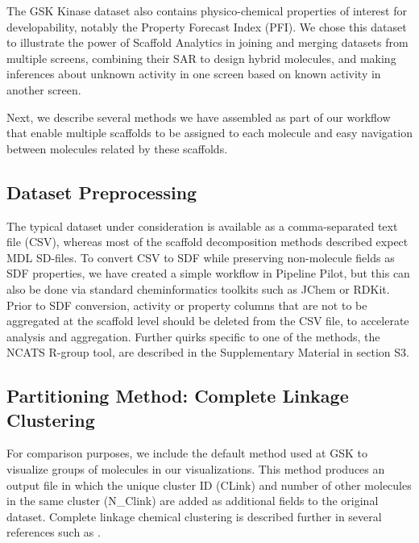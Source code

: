 \documentclass[journal=jacsat,biochem,manuscript=article]{achemso}
\newcommand*\tref[1]{Table~\ref{table:#1}}
\begin{document}
The GSK Kinase dataset also contains physico-chemical properties of interest for
developability, notably the Property Forecast Index (PFI\cite{Young2011}). 
We chose this dataset to illustrate the power of Scaffold Analytics in joining
and merging datasets from multiple screens, combining their SAR to
design hybrid molecules, and making inferences about unknown activity
in one screen based on known activity in another screen.


Next, we describe several methods we have assembled as part of our
workflow that enable multiple scaffolds to be assigned to each
molecule and easy navigation between molecules related by these
scaffolds.


\subsection{Dataset Preprocessing}
\label{sec:prepro}
The typical dataset under consideration is available as a
comma-separated text file (CSV), whereas most of the scaffold
decomposition methods described expect MDL SD-files. To convert CSV to
SDF while preserving non-molecule fields as SDF properties, we have
created a simple workflow in Pipeline Pilot\cite{PPilot}, but this can also be done
via standard cheminformatics toolkits such as JChem\cite{JChem} or RDKit\cite{RDKit}. Prior to
SDF conversion, activity or property columns that are not to be
aggregated at the scaffold level should be deleted from the CSV file,
to accelerate analysis and aggregation.  Further quirks specific to one of the methods, the NCATS R-group tool,
are described in the Supplementary Material in section S3.

\subsection{Partitioning Method: Complete Linkage Clustering}
For comparison purposes, we include the default method used at GSK to visualize groups of
molecules in our visualizations. This
method produces an output file in which the unique cluster ID (CLink)
and number of other molecules in the same cluster (N\_Clink) are added
as additional fields to the original dataset.  Complete linkage
chemical clustering is described further in several references such
as \citet{Jain2010,Downs2003}.
\end{document}
